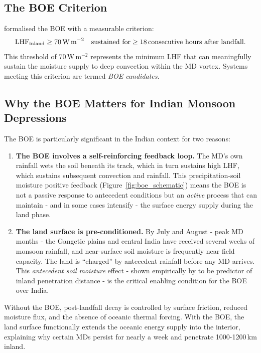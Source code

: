 \subsection{The BOE Criterion}
\label{subsec:boe_criterion}

\citet{andersen2013} formalised the BOE with a measurable criterion:
\begin{equation}
  \text{LHF}_\text{inland} \geq 70\,\text{W\,m}^{-2}
  \quad \text{sustained for} \geq 18\,\text{consecutive hours after landfall.}
  \label{eq:boe_intro}
\end{equation}
This threshold of 70\,W\,m$^{-2}$ represents the minimum LHF that can
meaningfully sustain the moisture supply to deep convection within
the MD vortex. Systems meeting this criterion are termed \emph{BOE candidates}.

\subsection{Why the BOE Matters for Indian Monsoon Depressions}
\label{subsec:boe_significance}

The BOE is particularly significant in the Indian context for two reasons:
\begin{enumerate}
  \item \textbf{The BOE involves a self-reinforcing feedback loop.}
    The MD's own rainfall wets the soil beneath its track, which in
    turn sustains high LHF, which sustains subsequent convection and
    rainfall. This precipitation-soil moisture positive feedback
    (Figure~\ref{fig:boe_schematic}) means the BOE is not a passive
    response to antecedent conditions but an \emph{active} process
    that can maintain - and in some cases intensify - the surface
    energy supply during the land phase.
  \item \textbf{The land surface is pre-conditioned.} By July and
    August - peak MD months - the Gangetic plains and central India have
    received several weeks of monsoon rainfall, and near-surface soil
    moisture is frequently near field capacity. The land is ``charged''
    by antecedent rainfall before any MD arrives. This  \emph{antecedent
    soil moisture} effect - shown empirically by
    \citet{kishtawal2013enhancement} to be predictor of inland penetration
    distance - is the critical enabling condition for the BOE over India.
\end{enumerate}

Without the BOE, post-landfall decay is controlled by surface
friction, reduced moisture flux, and the absence of oceanic thermal
forcing. With the BOE, the land surface functionally extends the
oceanic energy supply into the interior, explaining why certain MDs
persist for nearly a week and penetrate 1000-1200\,km inland.

